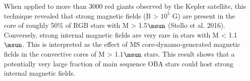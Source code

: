 When applied to more than 3000 red giants observed by the Kepler satellite, this technique revealed that
strong magnetic fields (B > $10^5$ G) are present in the core of roughly 50\% of RGB stars with M > 1.5$\msun$ (Stello et al. 2016).
Conversely, strong internal magnetic fields are very rare in stars with M < 1.1$\msun$. This is interpreted as the
effect of MS core-dynamo-generated magnetic fields in the convective cores of M > 1.1$\msun$ stars.
This result shows that a potentially very large fraction of main sequence OBA stars could host strong internal magnetic fields.




